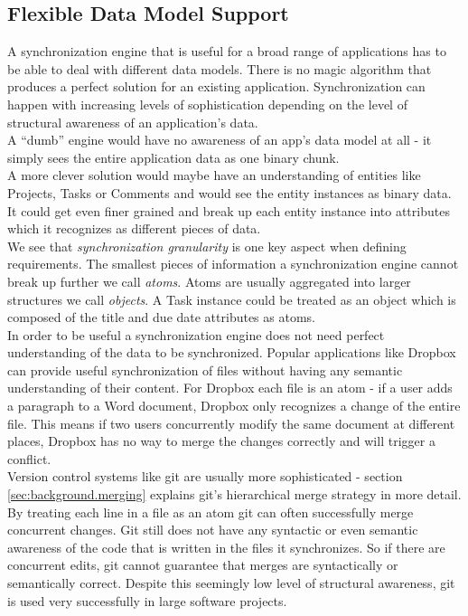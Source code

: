 \subsection{Flexible Data Model Support}
\label{sec:requirements.data-models}
A synchronization engine that is useful for a broad range of applications has to be able to deal with different data models. There is no magic algorithm that produces a perfect solution for an existing application.
Synchronization can happen with increasing levels of sophistication depending on the level of structural awareness of an application's data.\\
A ``dumb'' engine would have no awareness of an app's data model at all - it simply sees the entire application data as one binary chunk.\\
A more clever solution would maybe have an understanding of entities like Projects, Tasks or Comments and would see the entity instances as binary data.\\
It could get even finer grained and break up each entity instance into attributes which it recognizes as different pieces of data.\\
We see that \emph{synchronization granularity} is one key aspect when defining requirements.
The smallest pieces of information a synchronization engine cannot break up further we call \emph{atoms}.
Atoms are usually aggregated into larger structures we call \emph{objects}.
A Task instance could be treated as an object which is composed of the title and due date attributes as atoms.\\
In order to be useful a synchronization engine does not need perfect understanding of the data to be synchronized.
Popular applications like Dropbox can provide useful synchronization of files without having any semantic understanding of their content.
For Dropbox each file is an atom - if a user adds a paragraph to a Word document, Dropbox only recognizes a change of the entire file.
This means if two users concurrently modify the same document at different places, Dropbox has no way to merge the changes correctly and will trigger a conflict.\\
Version control systems like git are usually more sophisticated - section \ref{sec:background.merging} explains git's hierarchical merge strategy in more detail.
By treating each line in a file as an atom git can often successfully merge concurrent changes.
Git still does not have any syntactic or even semantic awareness of the code that is written in the files it synchronizes.
So if there are concurrent edits, git cannot guarantee that merges are syntactically or semantically correct.
Despite this seemingly low level of structural awareness, git is used very successfully in large software projects.\\

